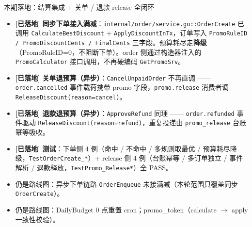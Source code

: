 \documentclass[aspectratio=169,11pt]{beamer}
\begin{document}
\begin{frame}[shrink]{本期落地：结算集成 + 关单 / 退款 release 全闭环}
\begin{itemize}
  \item \textcolor{cOK}{\textbf{[已落地]}} \textbf{同步下单接入满减}：\texttt{internal/order/service.go::OrderCreate} 已调用 \texttt{CalculateBestDiscount} + \texttt{ApplyDiscountInTx}，订单写入 \texttt{PromoRuleID / PromoDiscountCents / FinalCents} 三字段。预算耗尽走\textbf{降级}（PromoRuleID=0，不阻断下单）。order 侧通过构造器注入的 \texttt{PromoCalculator} 接口调用，不再硬编码 \texttt{GetPromoSrv}。
  \item \textcolor{cOK}{\textbf{[已落地]}} \textbf{关单退预算（异步）}：\texttt{CancelUnpaidOrder} 不再直调 —— \texttt{order.cancelled} 事件载荷携带 promo 字段，\texttt{promo.release} 消费者调 \texttt{ReleaseDiscount(reason=cancel)}。
  \item \textcolor{cOK}{\textbf{[已落地]}} \textbf{退款退预算（异步）}：\texttt{ApproveRefund} 同理 —— \texttt{order.refunded} 事件驱动 \texttt{ReleaseDiscount(reason=refund)}，重复投递由 \texttt{promo\_release} 台账幂等吸收。
  \item \textcolor{cOK}{\textbf{[已落地]}} \textbf{测试}：下单侧 4 例（命中 / 不命中 / 多规则取最优 / 预算耗尽降级，\texttt{TestOrderCreate\_*}）+ release 侧 4 例（台账幂等 / 多订单独立 / 事件解析 / 退款释放，\texttt{TestPromo\_Release*}）全 PASS。
  \item 仍是路线图：异步下单链路 \texttt{OrderEnqueue} 未接满减（本轮范围只覆盖同步 \texttt{OrderCreate}）。
  \item 仍是路线图：DailyBudget 0 点重置 cron；promo\_token（calculate $\to$ apply 一致性校验）。
\end{itemize}
\end{frame}
\end{document}

